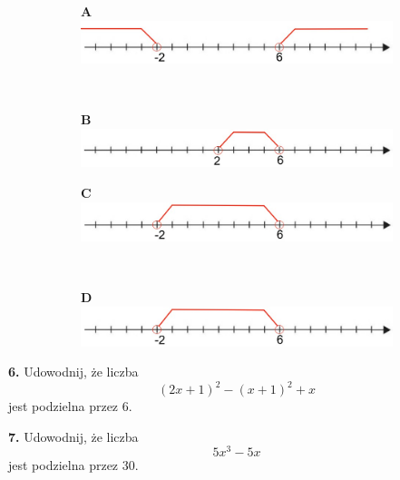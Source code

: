\documentclass[12pt,a4paper]{article}
\theoremstyle{break}
\begin{document}
\begin{figure}[h]
	\centering
	\begin{subfigure}[b]{0.45\textwidth}
		\Large \textbf{A}
		\includegraphics[width=\textwidth]{z1_2_1.jpeg}
		
	\end{subfigure}$\quad$
	\begin{subfigure}[b]{0.45\textwidth}
		\Large \textbf{B}
	\includegraphics[width=\textwidth]{z1_2_2.jpeg}
	
\end{subfigure}
\end{figure}
\begin{figure}[h]
	\centering
	\begin{subfigure}[b]{0.45\textwidth}
		\Large \textbf{C}
		\includegraphics[width=\textwidth]{z1_2_3.jpeg}
		
	\end{subfigure}$\quad$
	\begin{subfigure}[b]{0.45\textwidth}
		\Large \textbf{D}
		\includegraphics[width=\textwidth]{z1_2_3.jpeg}
	\end{subfigure}
\end{figure}

					\begin{mdframed}[%
	linecolor=white,%
	innertopmargin=\topskip,
	shadowsize=0,%
	innertopmargin=5,%
	innerbottommargin=5,%
	leftmargin=10,%
	rightmargin=10,%
	backgroundcolor=gray!20,%
	innertopmargin=0pt,]
	\vspace{0.2cm}
	\textbf{6.} Udowodnij, że liczba $$(2x+1)^2-(x+1)^2+x$$ jest podzielna przez 6.
\end{mdframed}

					\begin{mdframed}[%
	linecolor=white,%
	innertopmargin=\topskip,
	shadowsize=0,%
	innertopmargin=5,%
	innerbottommargin=5,%
	leftmargin=10,%
	rightmargin=10,%
	backgroundcolor=gray!20,%
	innertopmargin=0pt,]
	\vspace{0.2cm}
	\textbf{7.} Udowodnij, że liczba $$5x^3-5x$$ jest podzielna przez 30.
\end{mdframed}
	
\end{document}
